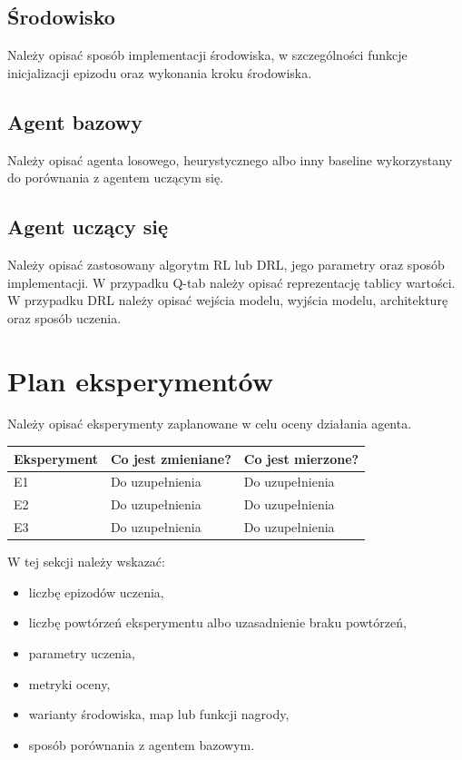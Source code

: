 \documentclass[12pt]{article}
\begin{document}
\subsection{Środowisko}

Należy opisać sposób implementacji środowiska, w szczególności funkcje inicjalizacji epizodu oraz wykonania kroku środowiska.

\subsection{Agent bazowy}

Należy opisać agenta losowego, heurystycznego albo inny baseline wykorzystany do porównania z agentem uczącym się.

\subsection{Agent uczący się}

Należy opisać zastosowany algorytm RL lub DRL, jego parametry oraz sposób implementacji. W przypadku Q-tab należy opisać reprezentację tablicy wartości. W przypadku DRL należy opisać wejścia modelu, wyjścia modelu, architekturę oraz sposób uczenia.

\section{Plan eksperymentów}

Należy opisać eksperymenty zaplanowane w celu oceny działania agenta.

\begin{center}
\begin{tabular}{p{}p{}p{}}
\toprule
Eksperyment & Co jest zmieniane? & Co jest mierzone? \\
\midrule
E1 & Do uzupełnienia & Do uzupełnienia \\
E2 & Do uzupełnienia & Do uzupełnienia \\
E3 & Do uzupełnienia & Do uzupełnienia \\
\bottomrule
\end{tabular}
\end{center}

W tej sekcji należy wskazać:
\begin{itemize}
    \item liczbę epizodów uczenia,
    \item liczbę powtórzeń eksperymentu albo uzasadnienie braku powtórzeń,
    \item parametry uczenia,
    \item metryki oceny,
    \item warianty środowiska, map lub funkcji nagrody,
    \item sposób porównania z agentem bazowym.
\end{itemize}
\end{document}
